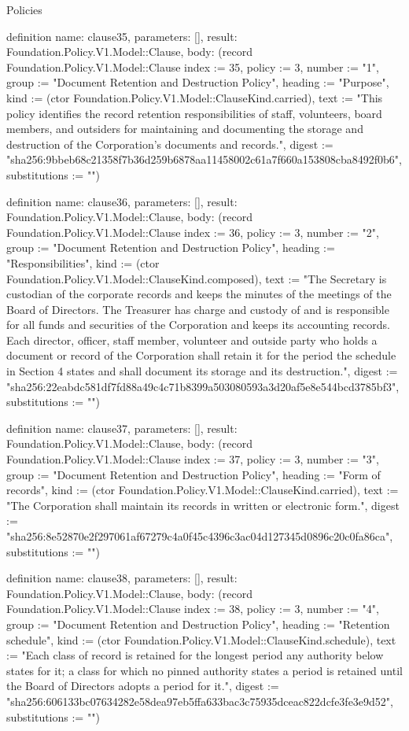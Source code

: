 \begin{lexlean}{Policies}
\begin{semanticmodule}
definition{
  name: clause35,
  parameters: [],
  result: Foundation.Policy.V1.Model::Clause,
  body: (record Foundation.Policy.V1.Model::Clause {index := 35, policy := 3, number := "1", group := "Document Retention and Destruction Policy", heading := "Purpose", kind := (ctor Foundation.Policy.V1.Model::ClauseKind.carried), text := "This policy identifies the record retention responsibilities of staff, volunteers, board members, and outsiders for maintaining and documenting the storage and destruction of the Corporation’s documents and records.", digest := "sha256:9bbeb68c21358f7b36d259b6878aa11458002c61a7f660a153808cba8492f0b6", substitutions := ""})
}

definition{
  name: clause36,
  parameters: [],
  result: Foundation.Policy.V1.Model::Clause,
  body: (record Foundation.Policy.V1.Model::Clause {index := 36, policy := 3, number := "2", group := "Document Retention and Destruction Policy", heading := "Responsibilities", kind := (ctor Foundation.Policy.V1.Model::ClauseKind.composed), text := "The Secretary is custodian of the corporate records and keeps the minutes of the meetings of the Board of Directors. The Treasurer has charge and custody of and is responsible for all funds and securities of the Corporation and keeps its accounting records. Each director, officer, staff member, volunteer and outside party who holds a document or record of the Corporation shall retain it for the period the schedule in Section 4 states and shall document its storage and its destruction.", digest := "sha256:22eabdc581df7fd88a49c4c71b8399a503080593a3d20af5e8e544bcd3785bf3", substitutions := ""})
}

definition{
  name: clause37,
  parameters: [],
  result: Foundation.Policy.V1.Model::Clause,
  body: (record Foundation.Policy.V1.Model::Clause {index := 37, policy := 3, number := "3", group := "Document Retention and Destruction Policy", heading := "Form of records", kind := (ctor Foundation.Policy.V1.Model::ClauseKind.carried), text := "The Corporation shall maintain its records in written or electronic form.", digest := "sha256:8e52870e2f297061af67279c4a0f45c4396c3ac04d127345d0896c20c0fa86ca", substitutions := ""})
}

definition{
  name: clause38,
  parameters: [],
  result: Foundation.Policy.V1.Model::Clause,
  body: (record Foundation.Policy.V1.Model::Clause {index := 38, policy := 3, number := "4", group := "Document Retention and Destruction Policy", heading := "Retention schedule", kind := (ctor Foundation.Policy.V1.Model::ClauseKind.schedule), text := "Each class of record is retained for the longest period any authority below states for it; a class for which no pinned authority states a period is retained until the Board of Directors adopts a period for it.", digest := "sha256:606133bc07634282e58dea97eb5ffa633bac3c75935dceac822dcfe3fe3e9d52", substitutions := ""})
}


\end{semanticmodule}
\end{lexlean}
